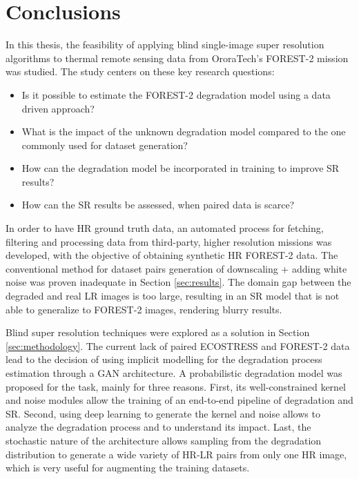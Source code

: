\section{Conclusions}

In this thesis, the feasibility of applying blind single-image super resolution algorithms to thermal remote sensing data from OroraTech’s FOREST-2 mission was studied. The study centers on these key research questions:

\begin{itemize}
    \item Is it possible to estimate the FOREST-2 degradation model using a data driven approach?
    \item What is the impact of the unknown degradation model compared to the one commonly used for dataset generation?
    \item How can the degradation model be incorporated in training to improve SR results?
    \item  How can the SR results be assessed, when paired data is scarce?
\end{itemize}

In order to have HR ground truth data, an automated process for fetching, filtering and processing data from third-party, higher resolution missions was developed, with the objective of obtaining synthetic HR FOREST-2 data. 
The conventional method for dataset pairs generation of downscaling + adding white noise was proven inadequate in Section \ref{sec:results}. The domain gap between the degraded and real LR images is too large, resulting in an SR model that is not able to generalize to FOREST-2 images, rendering blurry results.

Blind super resolution techniques were explored as a solution in Section \ref{sec:methodology}. The current  lack of paired ECOSTRESS and FOREST-2 data lead to the decision of using implicit modelling for the degradation process estimation through a GAN architecture. A probabilistic degradation model was proposed for the task, mainly for three reasons. First, its well-constrained kernel and noise modules allow the training of an end-to-end pipeline of degradation and SR. Second, using deep learning to generate the kernel and noise allows to analyze the degradation process and to understand its impact. Last, the stochastic nature of the architecture allows  sampling from the degradation distribution to generate a wide variety of HR-LR pairs from only one HR image, which is very useful for augmenting the training datasets.


